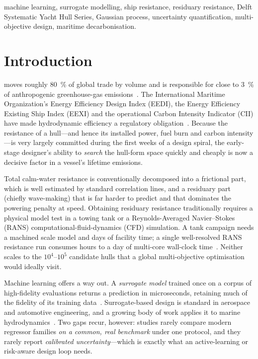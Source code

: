 \documentclass[conference]{IEEEtran}
\begin{document}
\begin{IEEEkeywords}
machine learning, surrogate modelling, ship resistance, residuary resistance,
Delft Systematic Yacht Hull Series, Gaussian process, uncertainty
quantification, multi-objective design, maritime decarbonisation.
\end{IEEEkeywords}

\section{Introduction}

 moves roughly \SI{80}{\percent} of global trade by
volume and is responsible for close to \SI{3}{\percent} of anthropogenic
greenhouse-gas emissions~\cite{imo2020,eu2023}. The International Maritime
Organization's Energy Efficiency Design Index (EEDI), the Energy Efficiency
Existing Ship Index (EEXI) and the operational Carbon Intensity Indicator (CII)
have made hydrodynamic efficiency a regulatory obligation~\cite{imo2020}.
Because the resistance of a hull---and hence its installed power, fuel burn and
carbon intensity---is very largely committed during the first weeks of a design
spiral, the early-stage designer's ability to \emph{search} the hull-form space
quickly and cheaply is now a decisive factor in a vessel's lifetime emissions.

Total calm-water resistance is conventionally decomposed into a frictional part,
which is well estimated by standard correlation lines, and a residuary part
(chiefly wave-making) that is far harder to predict and that dominates the
powering penalty at speed. Obtaining residuary resistance traditionally requires
a physical model test in a towing tank or a Reynolds-Averaged Navier--Stokes
(RANS) computational-fluid-dynamics (CFD) simulation. A tank campaign needs a
machined scale model and days of facility time; a single well-resolved RANS
resistance run consumes hours to a day of multi-core wall-clock
time~\cite{molland2011,stern2013}. Neither scales to the $10^{4}$--$10^{5}$
candidate hulls that a global multi-objective optimisation would ideally visit.

Machine learning offers a way out. A \emph{surrogate model} trained once on a
corpus of high-fidelity evaluations returns a prediction in microseconds,
retaining much of the fidelity of its training data~\cite{forrester2008,
queipo2005}. Surrogate-based design is standard in aerospace and automotive
engineering, and a growing body of work applies it to marine
hydrodynamics~\cite{ao2021,cepowski2020,marlantes2023}. Two gaps recur, however:
studies rarely compare modern regressor families \emph{on a common, real
benchmark} under one protocol, and they rarely report \emph{calibrated
uncertainty}---which is exactly what an active-learning or risk-aware design
loop needs.
\end{document}

